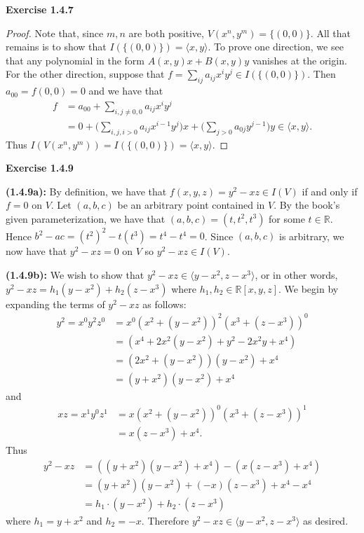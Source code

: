 \documentclass[12pt,oneside]{article}
\newenvironment{exercise}[1]{\vspace{.1in}\noindent\textbf{Exercise #1 \hspace{.05em}}}{}
\newcommand{\R}{\mathbb{R}}
\begin{document}
\begin{exercise}{1.4.7}
    \begin{proof}
        Note that, since $m,n$ are both positive, $V(x^n,y^m) = \{(0,0)\}$. All 
        that remains is to show that $I(\{(0,0)\}) = \langle x,y \rangle$. To 
        prove one direction, we see that any polynomial in the form $A(x,y)x +B(x,y)y$
        vanishes at the origin. For the other direction, suppose that 
        $f = \sum_{ij}a_{ij}x^iy^j \in I(\{(0,0)\})$. Then $a_{00} = f(0,0) = 0$ 
        and we have that 
        \begin{align*}
            f   &= a_{00} + \sum_{i,j \neq 0,0}a_{ij}x^iy^j\\
                &= 0 + \biggr(\sum_{i,j, i>0}a_{ij}x^{i-1}y^j \biggr)x + \biggr(\sum_{j>0}a_{0j}y^{j-1}\biggr)y \in \langle x,y \rangle.
        \end{align*}
        Thus $I(V(x^n,y^m)) = I(\{(0,0)\}) = \langle x,y \rangle$.
    \end{proof}
\end{exercise}


\begin{exercise}{1.4.9}

    \bigskip
    \textbf{(1.4.9a):}
    By definition, we have that $f(x,y,z) = y^2-xz \in I(V)$ if and only if 
    $f=0$ on $V$. Let $(a,b,c)$ be an arbitrary point contained in $V$. By 
    the book's given parameterization, we have that $(a,b,c) = (t,t^2,t^3)$ 
    for some $t \in \R$. Hence $b^2-ac = (t^2)^2-t(t^3)=t^4-t^4 = 0$. Since 
    $(a,b,c)$ is arbitrary, we now have that $y^2-xz = 0$ on $V$ so $y^2-xz \in I(V)$.

    \bigskip
    \textbf{(1.4.9b):}
    We wish to show that $y^2-xz \in \langle y-x^2,z-x^3 \rangle$, or in other words,
    $y^2-xz = h_1(y-x^2) + h_2(z-x^3)$ where $h_1,h_2 \in \R[x,y,z]$. We begin 
    by expanding the terms of $y^2-xz$ as follows:
    \begin{align*}
        y^2 = x^0y^2z^0 &= x^0(x^2+(y-x^2))^2(x^3+(z-x^3))^0\\
                        &= (x^4+2x^2(y-x^2)+y^2-2x^2y+x^4)\\
                        &= (2x^2+(y-x^2))(y-x^2)+x^4\\
                        &= (y+x^2)(y-x^2)+x^4
    \end{align*}
    and 
    \begin{align*}
        xz = x^1y^0z^1  &= x(x^2+(y-x^2))^0(x^3+(z-x^3))^1\\
                        &= x(z-x^3)+x^4.
    \end{align*}
    Thus 
    \begin{align*}
        y^2-xz  &= ((y+x^2)(y-x^2)+x^4)-(x(z-x^3)+x^4)\\
                &= (y+x^2)(y-x^2)+(-x)(z-x^3) +x^4-x^4\\
                &= h_1 \cdot (y-x^2) + h_2 \cdot(z-x^3)
    \end{align*}
    where $h_1 = y+x^2$ and $h_2 = -x$. Therefore $y^2-xz \in \langle y-x^2,z-x^3 \rangle$ 
    as desired.
\end{exercise}


\end{document}
